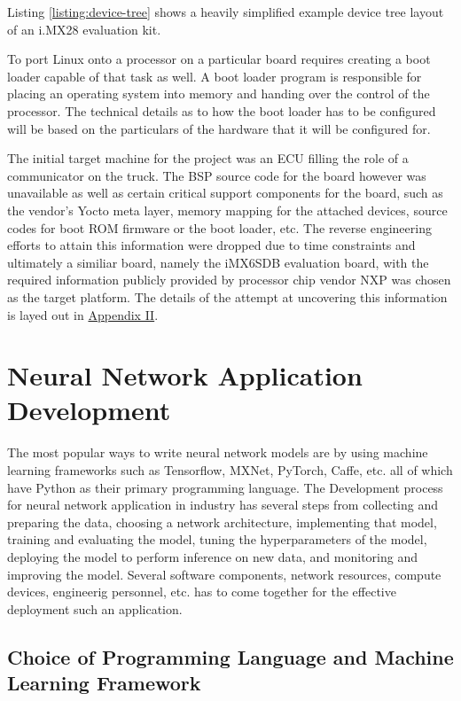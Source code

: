Listing \ref{listing:device-tree} shows a heavily simplified example device tree layout of an i.MX28 evaluation kit.

To port Linux onto a processor on a particular board requires creating a boot loader capable of that task as well. A boot loader program is responsible for placing an operating system into memory and handing over the control of the processor. The technical details as to how the boot loader has to be configured will be based on the particulars of the hardware that it will be configured for.

The initial target machine for the project was an ECU filling the role of a communicator on the truck. The BSP source code for the board however was unavailable as well as certain critical support components for the board, such as the vendor's Yocto meta layer, memory mapping for the attached devices, source codes for boot ROM firmware or the boot loader, etc. The reverse engineering efforts to attain this information were dropped due to time constraints and ultimately a similiar board, namely the iMX6SDB evaluation board, with the required information publicly provided by processor chip vendor NXP was chosen as the target platform. The details of the attempt at uncovering this information is layed out in \hyperref[rtc-c300]{Appendix II}.

\section{Neural Network Application Development}

The most popular ways to write neural network models are by using machine learning frameworks such as Tensorflow, MXNet, PyTorch, Caffe, etc. all of which have Python as their primary programming language. The Development process for neural network application in industry has several steps from collecting and preparing the data, choosing a network architecture, implementing that model, training and evaluating the model, tuning the hyperparameters of the model, deploying the model to perform inference on new data, and monitoring and improving the model. Several software components, network resources, compute devices, engineerig personnel, etc. has to come together for the effective deployment such an application.

\subsection{Choice of Programming Language and Machine Learning Framework}

